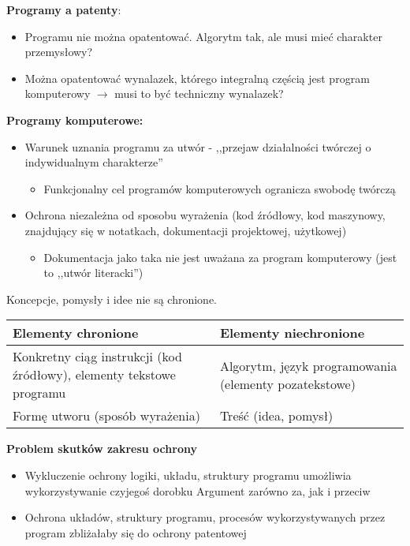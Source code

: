 \documentclass[12pt,a4paper]{article}
\begin{document}
\textbf{Programy a patenty}:
\begin{itemize}
\item Programu nie można opatentować. Algorytm tak, ale musi mieć charakter przemysłowy?
\item Można opatentować wynalazek, którego integralną częścią jest program komputerowy $\rightarrow$ musi to być techniczny wynalazek?
\end{itemize}
\noindent
\textbf{Programy komputerowe:}
\begin{itemize}
\item Warunek uznania programu za utwór - ,,przejaw działalności twórczej o indywidualnym charakterze''
	\begin{itemize}
		\item Funkcjonalny cel programów komputerowych ogranicza swobodę twórczą
	\end{itemize}
\item Ochrona niezależna od sposobu wyrażenia (kod źródłowy, kod maszynowy, znajdujący się w notatkach, dokumentacji projektowej, użytkowej)
	\begin{itemize}
		\item Dokumentacja jako taka nie jest uważana za program komputerowy (jest to ,,utwór literacki'')
	\end{itemize}
\end{itemize}
Koncepcje, pomysły i idee nie są chronione.
\begin{center}
\begin{tabularx}{\textwidth}{|X|X|}
\hline
\textbf{Elementy chronione} & \textbf{Elementy niechronione}\\
\hline
Konkretny ciąg instrukcji (kod źródłowy), elementy tekstowe programu & Algorytm, język programowania (elementy pozatekstowe) \\
\hline
Formę utworu (sposób wyrażenia) & Treść (idea, pomysł)\\
\hline
\end{tabularx}
\end{center}
\noindent
\textbf{Problem skutków zakresu ochrony}
\begin{itemize}
\item Wykluczenie ochrony logiki, układu, struktury programu umożliwia wykorzystywanie czyjegoś dorobku
	\subitem * Argument zarówno za, jak i przeciw
\item Ochrona układów, struktury programu, procesów wykorzystywanych przez program zbliżałaby się do ochrony patentowej
\end{itemize}
\noindent
\end{document}
